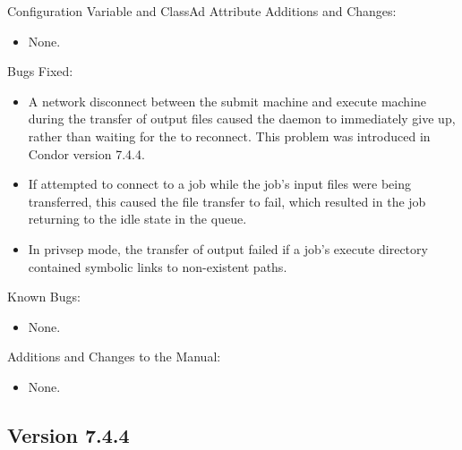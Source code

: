 \noindent Configuration Variable and ClassAd Attribute Additions and Changes:

\begin{itemize}

\item None.

\end{itemize}

\noindent Bugs Fixed:

\begin{itemize}

\item A network disconnect between the submit machine and execute
  machine during the transfer of output files caused the
   daemon to immediately give up, rather than waiting
  for the  to reconnect.  This problem was introduced
  in Condor version 7.4.4.

\item If  attempted to connect to a job while the
  job's input files were being transferred, this caused the file
  transfer to fail, which resulted in the job returning to the idle
  state in the queue.

\item In privsep mode, the transfer of output failed if a job's execute
  directory contained symbolic links to non-existent paths.

\end{itemize}

\noindent Known Bugs:

\begin{itemize}

\item None.

\end{itemize}

\noindent Additions and Changes to the Manual:

\begin{itemize}

\item None.

\end{itemize}


\subsection*{\label{sec:New-7-4-4}Version 7.4.4}

